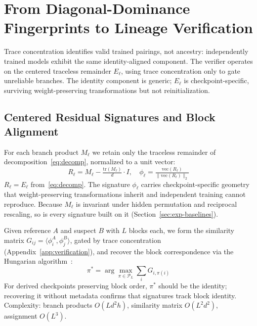\section{From Diagonal-Dominance Fingerprints to Lineage Verification}\label{sec:verification}

Trace concentration identifies valid trained pairings, not ancestry: independently trained models exhibit the same identity-aligned component. The verifier operates on the centered traceless remainder $E_\ell$, using trace concentration only to gate unreliable branches. The identity component is generic; $E_\ell$ is checkpoint-specific, surviving weight-preserving transformations but not reinitialization.

\subsection{Centered Residual Signatures and Block Alignment}\label{sec:pairing}

For each branch product $M_\ell$ we retain only the traceless remainder of decomposition~\eqref{eq:decomp}, normalized to a unit vector:
\begin{equation}\label{eq:centered-fingerprint}
R_\ell = M_\ell - \tfrac{\mathrm{tr}(M_\ell)}{d} \cdot I, \quad
\phi_\ell = \tfrac{\mathrm{vec}(R_\ell)}{\|\mathrm{vec}(R_\ell)\|_2}
\end{equation}
$R_\ell = E_\ell$ from~\eqref{eq:decomp}. The signature $\phi_\ell$ carries checkpoint-specific geometry that weight-preserving transformations inherit and independent training cannot reproduce. Because $M_\ell$ is invariant under hidden permutation and reciprocal rescaling, so is every signature built on it (Section~\ref{sec:exp-baselines}).

Given reference $A$ and suspect $B$ with $L$ blocks each, we form the similarity matrix $G_{ij} = \langle \phi^A_i, \phi^B_j \rangle$, gated by trace concentration (Appendix~\ref{app:verification}), and recover the block correspondence via the Hungarian algorithm~\citep{kuhn1955hungarian}:
\begin{equation}\label{eq:hungarian}
\pi^* = \arg\max_{\pi \in \mathcal{P}_L} \sum_{i} G_{i,\pi(i)}
\end{equation}
For derived checkpoints preserving block order, $\pi^*$ should be the identity; recovering it without metadata confirms that signatures track block identity. Complexity: branch products $O(Ld^2 h)$, similarity matrix $O(L^2 d^2)$, assignment $O(L^3)$.

